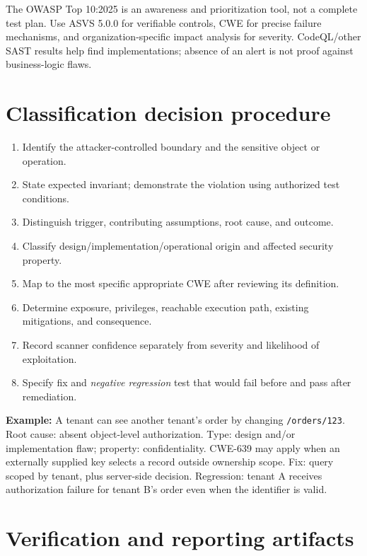 \documentclass[
  letterpaper,
]{article}
\providecommand{\tightlist}{%
  \setlength{\itemsep}{0pt}\setlength{\parskip}{0pt}}
\begin{document}
\begin{modernextension}
The OWASP Top 10:2025 is an awareness and prioritization tool, not a complete test plan. Use ASVS 5.0.0 for verifiable controls, CWE for precise failure mechanisms, and organization-specific impact analysis for severity. CodeQL/other SAST results help find implementations; absence of an alert is not proof against business-logic flaws.
\end{modernextension}

\section{Classification decision
procedure}\label{classification-decision-procedure}

\begin{enumerate}
\def\labelenumi{\arabic{enumi}.}
\tightlist
\item
  Identify the attacker-controlled boundary and the sensitive object or
  operation.
\item
  State expected invariant; demonstrate the violation using authorized
  test conditions.
\item
  Distinguish trigger, contributing assumptions, root cause, and
  outcome.
\item
  Classify design/implementation/operational origin and affected
  security property.
\item
  Map to the most specific appropriate CWE after reviewing its
  definition.
\item
  Determine exposure, privileges, reachable execution path, existing
  mitigations, and consequence.
\item
  Record scanner confidence separately from severity and likelihood of
  exploitation.
\item
  Specify fix and \emph{negative regression} test that would fail before
  and pass after remediation.
\end{enumerate}

\textbf{Example:} A tenant can see another tenant's order by changing
\texttt{/orders/123}. Root cause: absent object-level authorization.
Type: design and/or implementation flaw; property: confidentiality.
CWE-639 may apply when an externally supplied key selects a record
outside ownership scope. Fix: query scoped by tenant, plus server-side
decision. Regression: tenant A receives authorization failure for tenant
B's order even when the identifier is valid.

\section{Verification and reporting
artifacts}\label{verification-and-reporting-artifacts}
\end{document}
